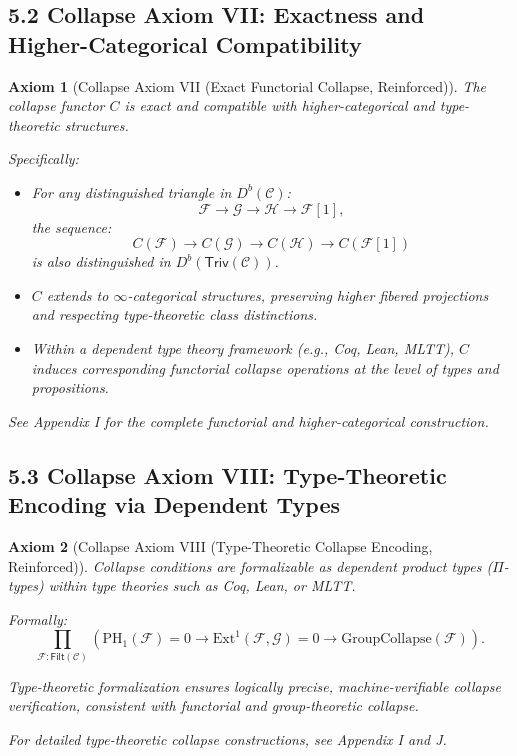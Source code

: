 \documentclass[11pt]{article}
\newtheorem{axiom}{Axiom}[section]
\begin{document}
\subsection*{5.2 Collapse Axiom VII: Exactness and Higher-Categorical Compatibility}

\begin{axiom}[Collapse Axiom VII (Exact Functorial Collapse, Reinforced)]
The collapse functor \( C \) is exact and compatible with higher-categorical and type-theoretic structures.

Specifically:
\begin{itemize}
    \item For any distinguished triangle in \( D^b(\mathcal{C}) \):
    \[
    \mathcal{F} \to \mathcal{G} \to \mathcal{H} \to \mathcal{F}[1],
    \]
    the sequence:
    \[
    C(\mathcal{F}) \to C(\mathcal{G}) \to C(\mathcal{H}) \to C(\mathcal{F}[1])
    \]
    is also distinguished in \( D^b(\mathsf{Triv}(\mathcal{C})) \).
    
    \item \( C \) extends to \(\infty\)-categorical structures, preserving higher fibered projections and respecting type-theoretic class distinctions.

    \item Within a dependent type theory framework (e.g., Coq, Lean, MLTT), \( C \) induces corresponding functorial collapse operations at the level of types and propositions.
\end{itemize}

See Appendix I for the complete functorial and higher-categorical construction.
\end{axiom}

\subsection*{5.3 Collapse Axiom VIII: Type-Theoretic Encoding via Dependent Types}

\begin{axiom}[Collapse Axiom VIII (Type-Theoretic Collapse Encoding, Reinforced)]
Collapse conditions are formalizable as dependent product types (\(\Pi\)-types) within type theories such as Coq, Lean, or MLTT.

Formally:
\[
\prod_{\mathcal{F}:\mathsf{Filt}(\mathcal{C})} \left( \mathrm{PH}_1(\mathcal{F}) = 0 \rightarrow \mathrm{Ext}^1(\mathcal{F}, \mathcal{G}) = 0 \rightarrow \text{GroupCollapse}(\mathcal{F}) \right).
\]

Type-theoretic formalization ensures logically precise, machine-verifiable collapse verification, consistent with functorial and group-theoretic collapse.

For detailed type-theoretic collapse constructions, see Appendix I and J.
\end{axiom}
\end{document}
